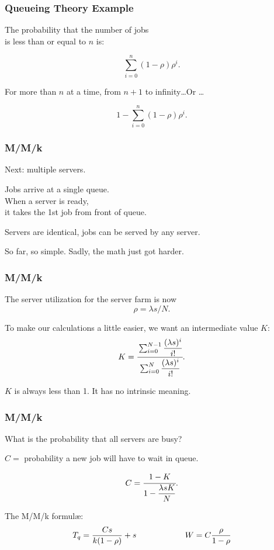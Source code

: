 \begin{frame}
\frametitle{Queueing Theory Example}

\large
\begin{changemargin}{1.5cm}
The probability that the number of jobs\\
 is less than or equal to $n$ is: 

\[ \sum\limits_{i=0}^{n}(1-\rho)\rho^{i}. \]

For more than $n$ at a time, from $n+1$ to infinity\ldots Or \ldots

\[ 1 - \sum\limits_{i=0}^{n}(1-\rho)\rho^{i}. \]
\end{changemargin}

\end{frame}



\begin{frame}
\frametitle{M/M/k}

\large
\begin{changemargin}{1.5cm}
Next: multiple servers.

Jobs arrive at a single queue. \\
When a server is ready, \\
it takes the 1st job from front of queue. 

Servers are identical, jobs can be served by any server. 

So far, so simple. Sadly, the math just got harder. 
\end{changemargin}

\end{frame}




\begin{frame}
\frametitle{M/M/k}

\large
\begin{changemargin}{1.5cm}
The server utilization for the server farm is now 
\[ \rho = \lambda s / N. \]

To make our calculations a little easier, we want an intermediate value $K$:
\[ K = \cfrac{\sum_{i=0}^{N-1}\dfrac{(\lambda s)^{i}}{i!}}{{\sum_{i=0}^{N}\dfrac{(\lambda s)^{i}}{i!}}}.\]

$K$ is always less than 1. It has no intrinsic meaning.
\end{changemargin}

\end{frame}

\begin{frame}
\frametitle{M/M/k}

\large
\begin{changemargin}{1.5cm}
What is the probability that all servers are busy? 

$C = $ probability a new job will have to wait in queue.

\[
	C = \cfrac{1 - K}{1 - \dfrac{\lambda s K}{N}}.\]

The M/M/k formul\ae: \\[0em]

\[ T_{q} = \dfrac{C s}{k(1 - \rho)} + s \mbox{\qquad\qquad\qquad} W = C \dfrac{\rho}{1 - \rho} \]
\end{changemargin}

\end{frame}


